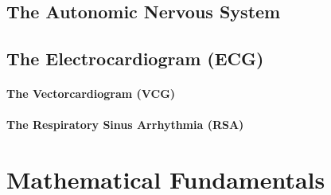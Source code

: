 \subsection{The Autonomic Nervous System}
\label{ans}



\subsection{The Electrocardiogram (ECG)}
\label{ecg}
\paragraph{The Vectorcardiogram (VCG)}
\label{vcg}
\paragraph{The Respiratory Sinus Arrhythmia (RSA)}
\label{rsa}







\section{Mathematical Fundamentals}
\label{mathematicalFundamentals}



